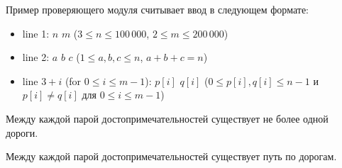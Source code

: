 Пример проверяющего модуля считывает ввод в следующем формате:
\begin{itemize}
\item line 1:  $n$ $m$ ($3 \leq n \leq 100\,000$, $2 \leq m \leq 200\,000$) 
\item line 2:  $a$ $b$ $c$ ($1 \leq a, b, c \leq n$, $a+b+c = n$)
\item line $3+i$ (for $0 \leq i \leq m-1$):  $p[i]$ $q[i]$ ($0 \leq p[i], q[i] \leq n-1$ и $p[i] \neq q[i]$ для $0 \leq i \leq m - 1$)
\end{itemize}

Между каждой парой достопримечательностей существует не более одной
дороги.

Между каждой парой достопримечательностей существует путь по дорогам.